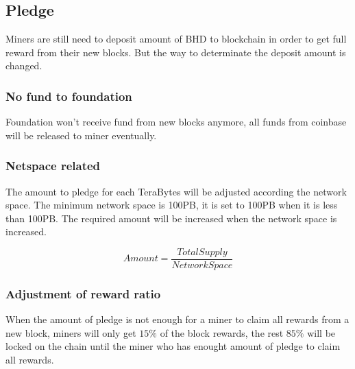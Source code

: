 \subsection{Pledge}
\begin{flushleft}
    Miners are still need to deposit amount of BHD to blockchain in order to get full reward from their new blocks. But the way to determinate the deposit amount is changed.
\end{flushleft}
\subsubsection{No fund to foundation}
\begin{flushleft}
    Foundation won't receive fund from new blocks anymore, all funds from coinbase will be released to miner eventually.
\end{flushleft}
\subsubsection{Netspace related}
\begin{flushleft}
    The amount to pledge for each TeraBytes will be adjusted according the network space. The minimum network space is 100PB, it is set to 100PB when it is less than 100PB. The required amount will be increased when the network space is increased.
\end{flushleft}
\begin{equation}
    Amount = \frac{TotalSupply}{NetworkSpace}
\end{equation}
\subsubsection{Adjustment of reward ratio}
\begin{flushleft}
    When the amount of pledge is not enough for a miner to claim all rewards from a new block, miners will only get $15\%$ of the block rewards, the rest $85\%$ will be locked on the chain until the miner who has enought amount of pledge to claim all rewards.
\end{flushleft}
